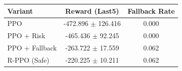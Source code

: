 \small
\setlength{\tabcolsep}{6pt}
\begin{tabular}{lcc}
\toprule
Variant & Reward (Last5) & Fallback Rate \\
\midrule
PPO & -472.896 $\pm$ 126.416 & 0.000 \\
PPO + Risk & -465.436 $\pm$ 92.245 & 0.000 \\
PPO + Fallback & -263.722 $\pm$ 17.559 & 0.062 \\
R-PPO (Safe) & -220.225 $\pm$ 10.211 & 0.062 \\
\bottomrule
\end{tabular}
